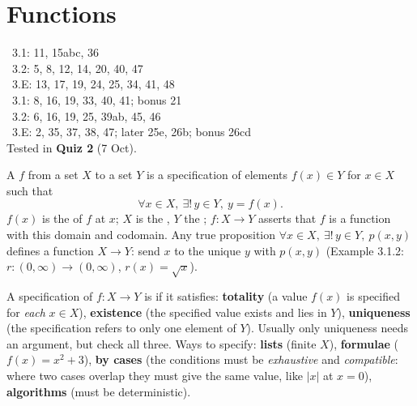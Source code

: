 \chapter{Functions}
%
{\fE\ 3.1: 11, 15abc, 36\\ \fE\ 3.2: 5, 8, 12, 14, 20, 40, 47\\ \fE\ 3.E: 13, 17, 19, 24, 25, 34, 41, 48\\ \fR\ 3.1: 8, 16, 19, 33, 40, 41; bonus 21\\ \fR\ 3.2: 6, 16, 19, 25, 39ab, 45, 46\\ \fR\ 3.E: 2, 35, 37, 38, 47; later 25e, 26b; bonus 26cd\\ Tested in \textbf{Quiz 2} (7 Oct).}


\begin{key}
A  $f$ from a set $X$ to a set $Y$ is a specification of elements $f(x)\in Y$ for $x\in X$ such that
\[
\forall x\in X,\ \exists!\,y\in Y,\ y=f(x).
\]
$f(x)$ is the  of $f$ at $x$; $X$ is the , $Y$ the ; $f:X\to Y$ asserts that $f$ is a function with this domain and codomain. Any true proposition $\forall x\in X,\ \exists!\,y\in Y,\ p(x,y)$ defines a function $X\to Y$: send $x$ to the unique $y$ with $p(x,y)$ (Example 3.1.2: $r:(0,\infty)\to(0,\infty)$, $r(x)=\sqrt x$).
\end{key}

\begin{strategy}
A specification of $f:X\to Y$ is  if it satisfies: \textbf{totality} (a value $f(x)$ is specified for \emph{each} $x\in X$), \textbf{existence} (the specified value exists and lies in $Y$), \textbf{uniqueness} (the specification refers to only one element of $Y$). Usually only uniqueness needs an argument, but check all three. Ways to specify: \textbf{lists} (finite $X$), \textbf{formulae} ($f(x)=x^2+3$), \textbf{by cases} (the conditions must be \emph{exhaustive} and \emph{compatible}: where two cases overlap they must give the same value, like $|x|$ at $x=0$), \textbf{algorithms} (must be deterministic).
\end{strategy}

